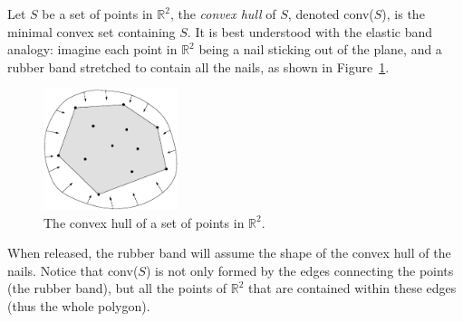 Let $S$ be a set of points in $\mathbb{R}^2$, the \emph{convex hull} of $S$, denoted conv($S$), is the minimal convex set containing $S$. 
It is best understood with the elastic band analogy: imagine each point in $\mathbb{R}^2$ being a nail sticking out of the plane, and a rubber band stretched to contain all the nails, as shown in Figure~\ref{fig:convex_hull}. 
\begin{figure}
  \centering
  \includegraphics[width=0.35\textwidth]{figs/convex_hull}
  \caption{The convex hull of a set of points in $\mathbb{R}^2$.} 
\label{fig:convex_hull}
\end{figure}
When released, the rubber band will assume the shape of the convex hull of the nails. 
Notice that conv($S$) is not only formed by the edges connecting the points (the rubber band), but all the points of $\mathbb{R}^2$ that are contained within these edges (thus the whole polygon).


%
